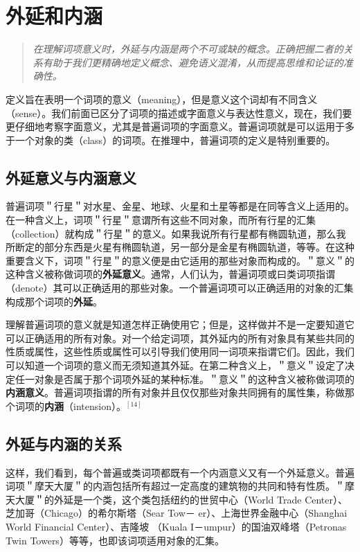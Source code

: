 \section{外延和内涵}

\begin{quotation}
\textit{在理解词项意义时，外延与内涵是两个不可或缺的概念。正确把握二者的关系有助于我们更精确地定义概念、避免语义混淆，从而提高思维和论证的准确性。}
\end{quotation}

定义旨在表明一个词项的意义（meaning），但是意义这个词却有不同含义（sense）。我们前面已区分了词项的描述或字面意义与表达性意义，现在，我们要更仔细地考察字面意义，尤其是普遍词项的字面意义。普遍词项就是可以运用于多于一个对象的类（class）的词项。在推理中，普遍词项的定义是特别重要的。

\subsection{外延意义与内涵意义}

普遍词项＂行星＂对水星、金星、地球、火星和土星等都是在同等含义上适用的。在一种含义上，词项＂行星＂意谓所有这些不同对象，而所有行星的汇集（collection）就构成＂行星＂的意义。如果我说所有行星都有椭圆轨道，那么我所断定的部分东西是火星有椭圆轨道，另一部分是金星有椭圆轨道，等等。在这种重要含义下，词项＂行星＂的意义便是由它适用的那些对象而构成的。＂意义＂的这种含义被称做词项的\textbf{外延意义}。通常，人们认为，普遍词项或曰类词项指谓（denote）其可以正确适用的那些对象。一个普遍词项可以正确适用的对象的汇集构成那个词项的\textbf{外延}。

理解普遍词项的意义就是知道怎样正确使用它；但是，这样做并不是一定要知道它可以正确适用的所有对象。对一个给定词项，其外延内的所有对象具有某些共同的性质或属性，这些性质或属性可以引导我们使用同一词项来指谓它们。因此，我们可以知道一个词项的意义而无须知道其外延。在第二种含义上，＂意义＂设定了决定任一对象是否属于那个词项外延的某种标准。＂意义＂的这种含义被称做词项的\textbf{内涵意义}。普遍词项指谓的所有对象并且仅仅那些对象共同拥有的属性集，称做那个词项的\textbf{内涵}（intension）。$^{[14]}$

\subsection{外延与内涵的关系}

这样，我们看到，每个普遍或类词项都既有一个内涵意义又有一个外延意义。普遍词项＂摩天大厦＂的内涵包括所有超过一定高度的建筑物的共同和特有性质。＂摩天大厦＂的外延是一个类，这个类包括纽约的世贸中心（World Trade Center）、芝加哥（Chicago）的希尔斯塔（Sear Tow－ er）、上海世界金融中心（Shanghai World Financial Center）、吉隆坡 （Kuala I－umpur）的国油双峰塔（Petronas Twin Towers）等等，也即该词项适用对象的汇集。


